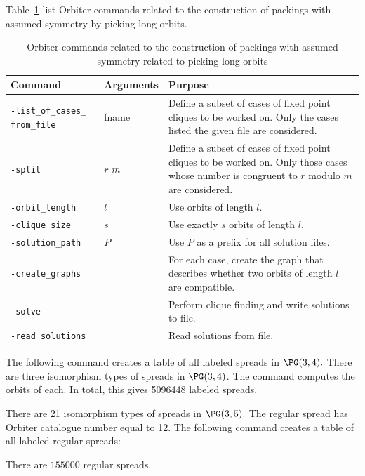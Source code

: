 \bigskip

Table~\ref{tab:packings:long:orbits} list Orbiter commands related to the construction 
of packings with assumed symmetry by picking long orbits.
\begin{table}
\begin{center}
\begin{tabular}{|p{5cm}|p{2cm}|p{7cm}|}
\hline
Command & Arguments & Purpose \\
\hline
\verb'-list_of_cases_' \verb'from_file' & fname   &  
Define a subset of cases of fixed point cliques to be worked on.  
Only the cases listed the given file are considered.  \\
\hline
\verb'-split' & $r$ $m$   & 
Define a subset of cases of fixed point cliques to be worked on. 
Only those cases whose number is congruent to $r$ modulo $m$ are considered. \\
\hline
\verb'-orbit_length' & $l$   &  Use orbits of length $l$. \\
\hline
\verb'-clique_size' &  $s$  & Use exactly $s$ orbits of length $l$. \\
\hline
\verb'-solution_path' &  $P$  &  Use $P$ as a prefix for all solution files. \\
\hline
\verb'-create_graphs' &    & 
For each case, create the graph that describes whether two orbits of length $l$ are compatible. \\
\hline
\verb'-solve' &    & 
Perform clique finding and write solutions to file. \\
\hline
\verb'-read_solutions' &    &  
Read solutions from file. \\
\hline
\end{tabular}
\end{center}
\caption{\label{tab:packings:long:orbits}Orbiter commands related to the construction 
of packings with assumed symmetry related to picking long orbits}
\end{table}


\bigskip

The following command creates a table of all labeled spreads in $\PG(3,4).$ 
There are three isomorphism types of spreads in $\PG(3,4)$. The command computes the orbits of each.
In total, this gives 5096448 labeled spreads. 
{\tt

}

\bigskip

There are 21 isomorphism types of spreads in $\PG(3,5).$ 
The regular spread has Orbiter catalogue number equal to 12. 
The following command creates a table of all labeled regular spreads:
{\tt

}
There are $155000$ regular spreads.




